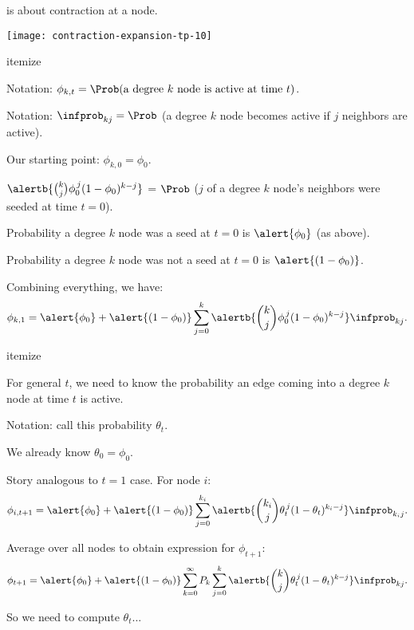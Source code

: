        is about \alert{contraction} at
      a node.
    
    \texttt{[image: contraction-expansion-tp-10]}
  

{itemize}
  
    \alert{Notation:}
    $ \phi_{k,t} = 
    \Prob(\mbox{a degree $k$ node is active at time $t$}) $.
  
    \alert{Notation:}
    $\infprob_{k j} = \Prob$ (a degree $k$ node becomes active
    if $j$ neighbors are active).
   
    Our starting point: $ \phi_{k,0} = \phi_0$.
  
    $ 
    \alertb{\binom{k}{j}
      \phi_0^{\, j}
      (1-\phi_0)^{k-j} }
    $ 
    =
    $\Prob$ ($j$ of a degree $k$ node's neighbors were seeded at time $t=0$).
   
    Probability a degree $k$ node was a seed at $t=0$ is $\alert{\phi_0}$ (as above).
   
    Probability a degree $k$ node was not a seed at $t=0$ is $\alert{(1-\phi_0)}$.
   
    Combining everything, we have:
    $$ 
    \phi_{k,1}
    = 
    \alert{\phi_{0}}
    + 
    \alert{(1-\phi_{0})}
    \sum_{j=0}^{k}
    \alertb{\binom{k}{j}
    \phi_0^{\, j}
    (1-\phi_0)^{k-j} }
  \infprob_{k j}.
    $$
  
  

{itemize}
  
    For general $t$, we need to know
    the probability an edge coming into a degree $k$ node
    at time $t$ is active.
  
    \alert{Notation:} call this probability $\theta_t$.
  
    We already know $\theta_0 = \phi_0$.
  
    Story analogous to $t=1$ case.  For node $i$:
    $$
    \phi_{i,t+1}
    = 
    \alert{\phi_{0}}
    + 
    \alert{(1-\phi_{0})}
    \sum_{j=0}^{k_i}
    \alertb{\binom{k_i}{j}
    \theta_t^{\, j}
    (1-\theta_t)^{k_i-j}}
    \infprob_{k_i j}.
    $$
  
    Average over all nodes to obtain expression for $\phi_{t+1}$:
    $$
    \phi_{t+1}
    = 
    \alert{\phi_{0}}
    + 
    \alert{(1-\phi_{0})}
    \sum_{k=0}^{\infty} P_k 
    \sum_{j=0}^{k}
    \alertb{\binom{k}{j}
    \theta_t^{\, j}
    (1-\theta_t)^{k-j}}
    \infprob_{kj}.
    $$
  
    So we need to compute $\theta_t$...  {}
  
